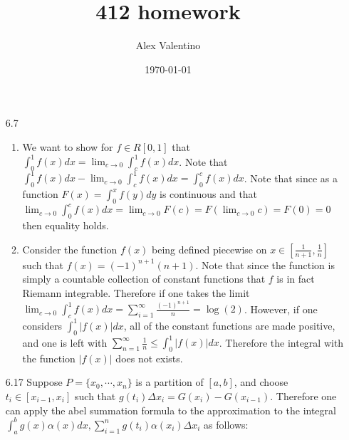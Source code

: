 \documentclass[12pt, letterpaper]{article}
\date{\today}
\author{Alex Valentino}
\title{412 homework}
\begin{document}
\begin{enumerate}
	\item[6.7]
	\begin{enumerate}
		\item We want to show for $f \in R[0,1]$ that 
		$\int_0^1 f(x) dx = \lim_{c \to 0} \int_c^1 f(x)dx$.  
		Note that $\int_0^1 f(x) dx - \lim_{c \to 0} \int_c^1 f(x)dx = 
		\int_0^c f(x) dx$.  Note that since as a function 
		$F(x) = \int_0^x f(y) dy$ is continuous and that 
		$\lim_{c \to 0} \int_0^c f(x) dx =
		\lim_{c \to 0} F(c) = F(\lim_{c \to 0} c) = F(0) = 0$
		then equality holds.
		\item Consider the function $f(x)$ being defined piecewise on 
		$x \in [\frac{1}{n+1},\frac{1}{n}]$ such that $f(x) = (-1)^{n+1}(n+1)$.
		Note that since the function is simply a countable collection of constant 
		functions that $f$ is in fact Riemann integrable.   
		Therefore if one takes the limit $\lim_{c \to 0} \int_c^1 f(x)dx = 
		\sum_{i=1}^\infty \frac{(-1)^{n+1}}{n} = \log(2)$.  However, if one 
		considers $\int_0^1 |f(x)|dx$, all of the constant functions are made 
		positive, and one is left with $\sum_{n=1}^\infty \frac{1}{n} \leq \int_0^1 |f(x)|dx$.  Therefore the integral with the function $|f(x)|$ does 
		not exists.  
	\end{enumerate}
	\item[6.17] Suppose $P = \{x_0,\cdots,x_n\}$ is a partition of $[a,b]$, 
	and choose $t_i \in [x_{i-1},x_{i}]$ such that $g(t_i)\Delta x_i = G(x_i) - G(x_{i-1})$.  Therefore one can apply the abel summation formula to the 
	approximation to the integral $\int_a^b g(x) \alpha(x) dx, \sum_{i=1}^n g(t_i)\alpha(x_i)\Delta x_i$ as follows:
	

\end{enumerate}
\end{document}
